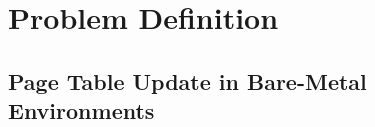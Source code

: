 \section{Problem Definition} \label{sec:prob}
\subsection{Page Table Update in Bare-Metal Environments}
